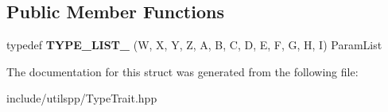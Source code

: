 \subsection*{Public Member Functions}
\begin{DoxyCompactItemize}
\item 
\hypertarget{structutilspp_1_1PointerOnFunction_3_01V_07_5_08_07W_00_01X_00_01Y_00_01Z_00_01A_00_01B_00_01C_028efef8fb2e99a7c8e542e8efa07b21c_a35a066c4c42c91e1e26e5f961b78d70e}{typedef {\bfseries T\-Y\-P\-E\-\_\-\-L\-I\-S\-T\-\_} (W, X, Y, Z, A, B, C, D, E, F, G, H, I) Param\-List}\label{structutilspp_1_1PointerOnFunction_3_01V_07_5_08_07W_00_01X_00_01Y_00_01Z_00_01A_00_01B_00_01C_028efef8fb2e99a7c8e542e8efa07b21c_a35a066c4c42c91e1e26e5f961b78d70e}

\end{DoxyCompactItemize}


The documentation for this struct was generated from the following file\-:\begin{DoxyCompactItemize}
\item 
include/utilspp/Type\-Trait.\-hpp\end{DoxyCompactItemize}
